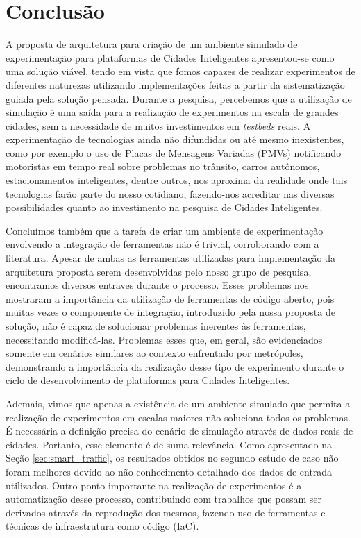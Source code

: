 \chapter{Conclusão}
\label{cap:conclusao}

%
%
%

A proposta de arquitetura para criação de um ambiente simulado de experimentação para plataformas de Cidades Inteligentes apresentou-se como uma solução viável, tendo em vista que fomos capazes de
realizar experimentos de diferentes naturezas utilizando implementações feitas a partir da sistematização guiada pela solução pensada.
Durante a pesquisa, percebemos que a utilização de simulação é uma saída para a realização de experimentos na escala de grandes cidades, sem a necessidade de muitos investimentos em \textit{testbeds} reais.
A experimentação de tecnologias ainda não difundidas ou até mesmo inexistentes, como por exemplo o uso de Placas de Mensagens Variadas (PMVs) notificando motoristas
em tempo real sobre problemas no trânsito, carros autônomos, estacionamentos inteligentes, dentre outros, nos aproxima da realidade onde tais tecnologias farão parte do nosso cotidiano, fazendo-nos
acreditar nas diversas possibilidades quanto ao investimento na pesquisa de Cidades Inteligentes.

Concluímos também que a tarefa de criar um ambiente de experimentação envolvendo a integração de ferramentas não é trivial, corroborando com a literatura.
Apesar de ambas as ferramentas utilizadas para implementação da arquitetura proposta serem desenvolvidas pelo nosso grupo de pesquisa, encontramos diversos entraves durante o processo.
Esses problemas nos mostraram a importância da utilização de ferramentas de código aberto, pois muitas vezes o componente de integração, introduzido pela nossa proposta de solução, não é capaz de
solucionar problemas inerentes às ferramentas, necessitando modificá-las.
Problemas esses que, em geral, são evidenciados somente em cenários similares ao contexto enfrentado por metrópoles, demonstrando a importância da realização desse tipo de experimento durante o ciclo de
desenvolvimento de plataformas para Cidades Inteligentes.

Ademais, vimos que apenas a existência de um ambiente simulado que permita a realização de experimentos em escalas maiores não soluciona todos os problemas.
É necessária a definição precisa do cenário de simulação através de dados reais de cidades.
Portanto, esse elemento é de suma relevância.
Como apresentado na Seção \ref{sec:smart_traffic}, os resultados obtidos no segundo estudo de caso não foram melhores devido ao não conhecimento detalhado dos dados de entrada utilizados.
Outro ponto importante na realização de experimentos é a automatização desse processo, contribuindo com trabalhos que possam ser derivados através da reprodução dos mesmos, fazendo uso de ferramentas
e técnicas de infraestrutura como código (IaC).

